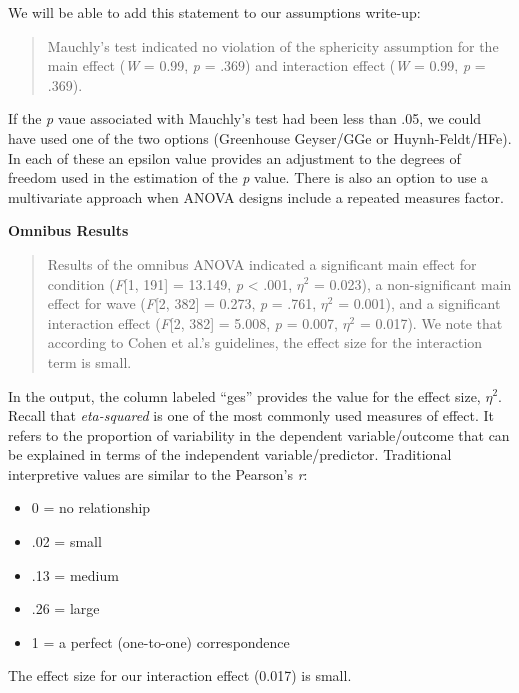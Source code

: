 \documentclass[
  11pt,
]{book}
\providecommand{\tightlist}{%
  \setlength{\itemsep}{0pt}\setlength{\parskip}{0pt}}
\begin{document}
We will be able to add this statement to our assumptions write-up:

\begin{quote}
Mauchly's test indicated no violation of the sphericity assumption for the main effect (\emph{W} = 0.99, \emph{p} = .369) and interaction effect (\emph{W} = 0.99, \emph{p} = .369).
\end{quote}

If the \emph{p} vaue associated with Mauchly's test had been less than .05, we could have used one of the two options (Greenhouse Geyser/GGe or Huynh-Feldt/HFe). In each of these an epsilon value provides an adjustment to the degrees of freedom used in the estimation of the \emph{p} value. There is also an option to use a multivariate approach when ANOVA designs include a repeated measures factor.

\textbf{Omnibus Results}

\begin{quote}
Results of the omnibus ANOVA indicated a significant main effect for condition (\emph{F}{[}1, 191{]} = 13.149, \emph{p} \textless{} .001, \(\eta^{2}\) = 0.023), a non-significant main effect for wave (\emph{F}{[}2, 382{]} = 0.273, \emph{p} = .761, \(\eta^{2}\) = 0.001), and a significant interaction effect (\emph{F}{[}2, 382{]} = 5.008, \emph{p} = 0.007, \(\eta^{2}\) = 0.017). We note that according to Cohen et al.'s \citep{cohen_applied_2003} guidelines, the effect size for the interaction term is small.
\end{quote}

In the output, the column labeled ``ges'' provides the value for the effect size, \(\eta^{2}\). Recall that \emph{eta-squared} is one of the most commonly used measures of effect. It refers to the proportion of variability in the dependent variable/outcome that can be explained in terms of the independent variable/predictor. Traditional interpretive values are similar to the Pearson's \emph{r}:

\begin{itemize}
\tightlist
\item
  0 = no relationship
\item
  .02 = small
\item
  .13 = medium
\item
  .26 = large
\item
  1 = a perfect (one-to-one) correspondence
\end{itemize}

The effect size for our interaction effect (0.017) is small.
\end{document}
